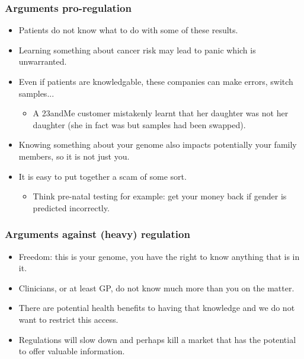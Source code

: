 \documentclass{beamer}
\begin{document}
\begin{frame}
  \frametitle{Arguments pro-regulation}
  \begin{itemize}
  \item Patients do not know what to do with some of these results.
  \item Learning something about cancer risk may lead to panic which is unwarranted.
  \item Even if patients are knowledgable, these companies can make errors, switch samples...
    \begin{itemize}
      \item A 23andMe customer mistakenly learnt that her daughter was not her daughter (she in fact was but samples had been swapped).
    \end{itemize}
  \item Knowing something about your genome also impacts potentially your family members, so it is not just you.
  \item It is easy to put together a scam of some sort.
    \begin{itemize}
    \item Think pre-natal testing for example: get your money back if gender is predicted incorrectly.
    \end{itemize}
  \end{itemize}
\end{frame}



\begin{frame}
  \frametitle{Arguments against (heavy) regulation}
  \begin{itemize}
  \item Freedom: this is your genome, you have the right to know anything that is in it.
  \item Clinicians, or at least GP, do not know much more than you on the matter.
  \item There are potential health benefits to having that knowledge and we do not want to restrict this access.
  \item Regulations will slow down and perhaps kill a market that has the potential to offer valuable information.
  \end{itemize}
\end{frame}
\end{document}
